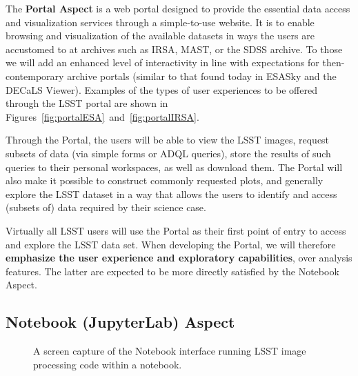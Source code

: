 The \textbf{Portal Aspect} is a web portal designed to provide the essential data
access and visualization services through a simple-to-use website.  It is to
enable browsing and visualization of the available datasets in ways the
users are accustomed to at archives such as IRSA, MAST, or the SDSS archive.
To those we will add an enhanced level of interactivity in line with expectations for
then-contemporary archive portals (similar to that found today in ESASky and
the DECaLS Viewer). Examples of the types of user experiences to be offered
through the LSST portal are shown in Figures~\ref{fig:portalESA}~and~\ref{fig:portalIRSA}.

Through the Portal, the users will be
able to view the LSST images, request subsets of data (via simple forms or
ADQL queries), store the results of such queries to their personal
workspaces, as well as download them. The Portal will also make it possible to
construct commonly requested plots, and generally explore the
LSST dataset in a way that allows the users to identify and access (subsets of)
data required by their science case.

Virtually all LSST users will use the Portal as their first point of entry to
access and explore the LSST data set. When developing the Portal,
we will therefore \textbf{emphasize the user experience and exploratory
capabilities}, over analysis features. The latter are expected to be more
directly satisfied by the Notebook Aspect.

\subsection{Notebook (JupyterLab) Aspect\label{sec:jupyter}}

\begin{figure}
	\centering
	\caption{A screen capture of the Notebook interface running LSST image processing code within a notebook. \label{fig:JupyterLab}}
\end{figure}

